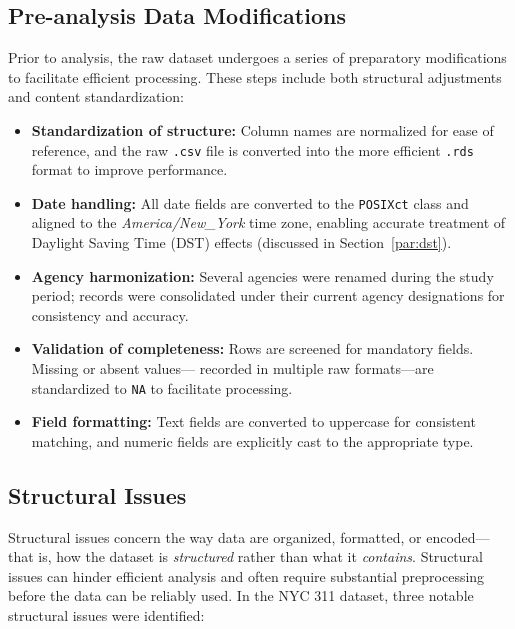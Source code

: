 \documentclass[linenumber]{jdsart}
\begin{document}

\subsection{Pre-analysis Data Modifications}
\label{subsec:premodifications}
Prior to analysis, the raw dataset undergoes a series of preparatory
modifications to facilitate efficient processing. These steps include both
structural adjustments and content standardization:

\begin{itemize}[left=1.5em]
  \item \textbf{Standardization of structure:}
  Column names are normalized for ease of reference, and the raw
  \texttt{.csv} file is converted into the more efficient \texttt{.rds} format
  to improve performance.

  \item \textbf{Date handling:}
  All date fields are converted to the \texttt{POSIXct} class and aligned
  to the \textit{America/New\_York} time zone, enabling accurate
  treatment of Daylight Saving Time (DST) effects (discussed in
  Section~\ref{par:dst}).

  \item \textbf{Agency harmonization:}
  Several agencies were renamed during the study period; records were
  consolidated under their current agency designations for consistency and
  accuracy.

  \item \textbf{Validation of completeness:}
  Rows are screened for mandatory fields. Missing or absent values—
  recorded in multiple raw formats—are standardized to \texttt{NA} to
  facilitate processing. 

  \item \textbf{Field formatting:}
  Text fields are converted to uppercase for consistent matching, and
  numeric fields are explicitly cast to the appropriate type.
\end{itemize}


\subsection{Structural Issues}
\label{subsec:structural}
Structural issues concern the way data are organized, formatted, or
encoded—that is, how the dataset is \emph{structured} rather than what it
\emph{contains}. Structural issues can hinder efficient analysis and often
require substantial preprocessing before the data can be reliably used. In the
NYC 311 dataset, three notable structural issues were identified:
\end{document}

